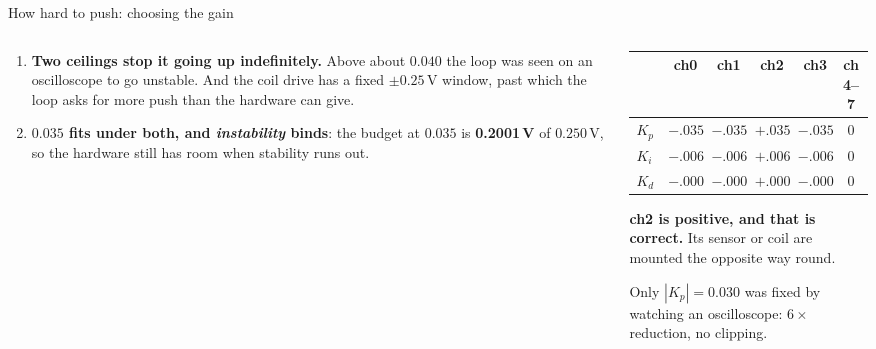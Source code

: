 \documentclass[aspectratio=169]{beamer}
\begin{document}
\begin{frame}{How hard to push: choosing the gain}
  \scriptsize
  \begin{columns}[T]
    \begin{column}{0.53\textwidth}
      \begin{enumerate}\setlength{\itemsep}{2.5pt}
        \item \textbf{Two ceilings stop it going up indefinitely.} Above about
              $0.040$ the loop was seen on an oscilloscope to go unstable. And
              the coil drive has a fixed $\pm 0.25$\,V window, past which the
              loop asks for more push than the hardware can give.
        \item \textbf{$0.035$ fits under both, and \emph{instability} binds}:
              the budget at $0.035$ is \textbf{0.2001\,V} of $0.250$\,V, so the
              hardware still has room when stability runs out.
      \end{enumerate}
    \end{column}
    \begin{column}{0.45\textwidth}
      \centering
      {\scriptsize\setlength{\tabcolsep}{2.5pt}
      \begin{tabular}{@{}lrrrr|c@{}}
        \toprule
        & ch0 & ch1 & \textbf{ch2} & ch3 & ch4--7 \\
        \midrule
        $K_p$ & $-.035$ & $-.035$ & $\mathbf{+.035}$ & $-.035$ & $0$ \\
        $K_i$ & $-.0060$ & $-.0060$ & $\mathbf{+.0060}$ & $-.0060$ & $0$ \\
        $K_d$ & $-.00045$ & $-.00045$ & $\mathbf{+.00045}$ & $-.00045$ & $0$ \\
        \bottomrule
      \end{tabular}}

      \vspace{2mm}
      \raggedright
      \textbf{ch2 is positive, and that is correct.} Its sensor or coil are
      mounted the opposite way round.

      \vspace{1.5mm}
      {\scriptsize Only $|K_p| = 0.030$ was fixed by watching an oscilloscope:
      $6\times$ reduction, no clipping.}
    \end{column}
  \end{columns}
\end{frame}
\end{document}
